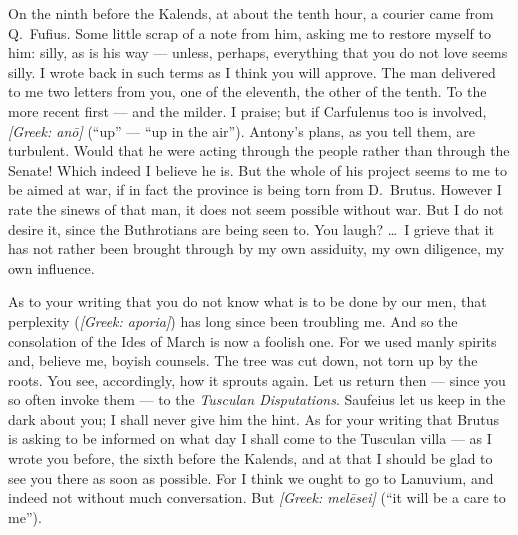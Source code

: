 

 On the ninth before the Kalends, at about the tenth hour, a courier came from Q.~Fufius. Some little scrap of a note from him, asking me to restore myself to him: silly, as is his way --- unless, perhaps, everything that you do not love seems silly. I wrote back in such terms as I think you will approve. The man delivered to me two letters from you, one of the eleventh, the other of the tenth. To the more recent first --- and the milder. I praise; but if Carfulenus too is involved, \textit{[Greek: an\=o]} (``up'' --- ``up in the air''). Antony's plans, as you tell them, are turbulent. Would that he were acting through the people rather than through the Senate! Which indeed I believe he is. But the whole of his project seems to me to be aimed at war, if in fact the province is being torn from D.~Brutus. However I rate the sinews of that man, it does not seem possible without war. But I do not desire it, since the Buthrotians are being seen to. You laugh? \dots\ I grieve that it has not rather been brought through by my own assiduity, my own diligence, my own influence.

 As to your writing that you do not know what is to be done by our men, that perplexity (\textit{[Greek: aporia]}) has long since been troubling me. And so the consolation of the Ides of March is now a foolish one. For we used manly spirits and, believe me, boyish counsels. The tree was cut down, not torn up by the roots. You see, accordingly, how it sprouts again. Let us return then --- since you so often invoke them --- to the \textit{Tusculan Disputations}. Saufeius let us keep in the dark about you; I shall never give him the hint. As for your writing that Brutus is asking to be informed on what day I shall come to the Tusculan villa --- as I wrote you before, the sixth before the Kalends, and at that I should be glad to see you there as soon as possible. For I think we ought to go to Lanuvium, and indeed not without much conversation. But \textit{[Greek: mel\=esei]} (``it will be a care to me'').

